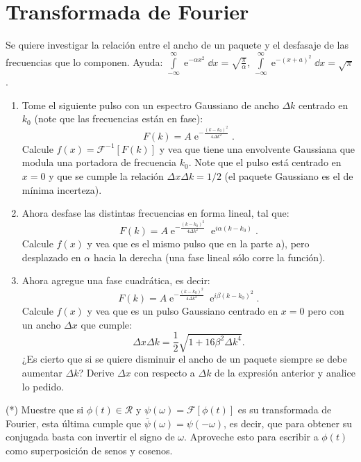\section*{Transformada de Fourier}

\item Se quiere investigar la relación entre el ancho de un paquete y el desfasaje de las frecuencias que lo componen.
Ayuda: \( \int\limits_{-\infty}^{\infty} \operatorname{e}^{-\alpha x^2} \dd{x} = \sqrt{\frac{\pi}{\alpha} } \), \( \int\limits_{-\infty}^{\infty} \operatorname{e}^{-(x+ a)^2} \dd{x} = \sqrt{\pi}\).
\begin{enumerate}
	\item Tome el siguiente pulso con un espectro Gaussiano de ancho $\Delta k$ centrado en $k_0$ (note que las frecuencias están en fase):
$$
F(k)=A \operatorname{e}^{-\frac{ ( k - k_0 )^2 }{ 4 \Delta k^2 } }.
$$
Calcule $f(x) = \mathcal{F}^{-1}[F(k)]$ y vea que tiene una envolvente Gaussiana que modula una portadora de frecuencia $k_{0}$.
Note que el pulso está centrado en $x=0$ y que se cumple la relación $\Delta x \Delta k = 1/2$ (el paquete Gaussiano es el de mínima incerteza).
	\item Ahora desfase las distintas frecuencias en forma lineal, tal que:
$$
F(k)=A \operatorname{e}^{ -\frac{ ( k - k_0 )^2 }{ 4 \Delta k^2 } } \operatorname{e}^{ i \alpha (k - k_0 ) }.
$$
Calcule $f(x)$ y vea que es el mismo pulso que en la parte a), pero desplazado en $\alpha$ hacia la derecha (una fase lineal sólo corre la función).
	\item Ahora agregue una fase cuadrática, es decir:
$$
F(k) = A \operatorname{e}^{-\frac{(k-k_{0})^{2}}{4\Delta k^{2}} } \operatorname{e}^{i \beta ( k - k_0 )^2 }.
$$
Calcule $f(x)$ y vea que es un pulso Gaussiano centrado en $x=0$ pero con un ancho $\Delta x$ que cumple:
$$
\Delta x \Delta k = \frac{1}{2} \sqrt{ 1 + 16 \beta^2 \Delta k^4 }.
$$
¿Es cierto que si se quiere disminuir el ancho de un paquete siempre se debe aumentar $\Delta k$?
Derive $\Delta x$ con respecto a $\Delta k$ de la expresión anterior y analice lo pedido.
\end{enumerate}


\item (*) Muestre que si $\phi(t) \in \mathcal{R}$ y $\psi(\omega)= \mathcal{F} \left[ \phi (t) \right]$ es su transformada de Fourier, esta última cumple que \( \overline{\psi}(\omega) = \psi(- \omega) \), es decir, que para obtener su conjugada basta con invertir el signo de $\omega$.
	Aproveche esto para escribir a $\phi(t)$ como superposición de senos y cosenos.
